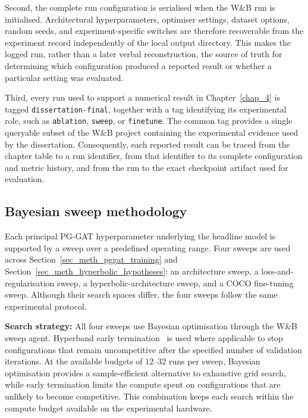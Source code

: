 Second,
the complete run configuration is serialised when the W\&B run
is initialised.
Architectural hyperparameters,
optimiser settings,
dataset options,
random seeds,
and experiment-specific switches are therefore recoverable
from the experiment record independently of the local output directory.
This makes the logged run,
rather than a later verbal reconstruction,
the source of truth for determining which configuration produced
a reported result or whether a particular setting was evaluated.

Third,
every run used to support a numerical result in
Chapter~\ref{chap_4} is tagged \texttt{dissertation-final},
together with a tag identifying its experimental role,
such as \texttt{ablation},
\texttt{sweep},
or \texttt{finetune}.
The common tag provides a single queryable subset of the W\&B project
containing the experimental evidence used by the dissertation.
Consequently,
each reported result can be traced from the chapter table
to a run identifier,
from that identifier to its complete configuration and metric history,
and from the run to the exact checkpoint artifact used for evaluation.

\subsection{Bayesian sweep methodology}
\label{sec_meth_evaluation_sweeps}

Each principal PG-GAT hyperparameter underlying the headline model is
supported by a sweep over a predefined operating range.
Four sweeps are used across Section~\ref{sec_meth_pggat_training} and
Section~\ref{sec_meth_hyperbolic_hypotheses}:
an architecture sweep,
a loss-and-regularisation sweep,
a hyperbolic-architecture sweep,
and a COCO fine-tuning sweep.
Although their search spaces differ,
the four sweeps follow the same experimental protocol.

\textbf{Search strategy:}
All four sweeps use Bayesian optimisation through the W\&B sweep
agent.
Hyperband early termination~\cite{li2018hyperband} is used where
applicable to stop configurations that remain uncompetitive after the
specified number of validation iterations.
At the available budgets of $12$--$32$ runs per sweep,
Bayesian optimisation provides a sample-efficient alternative
to exhaustive grid search,
while early termination limits the compute spent on configurations
that are unlikely to become competitive.
This combination keeps each search within the compute budget available
on the experimental hardware.

